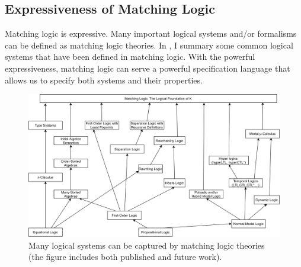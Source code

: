 \documentclass[11pt]{article}
\begin{document}




\subsection{Expressiveness of Matching Logic}
\label{sec:ml-expressiveness}

Matching logic is expressive. 
Many important logical systems and/or formalisms can be defined as matching 
logic theories. 
In , I summary some common logical systems that have been 
defined in matching logic. 
With the powerful expressiveness, matching logic can serve a powerful 
{specification language} that allows us to specify both systems and their 
properties. 

\begin{figure}[t]
\centering
\includegraphics[width=0.9\columnwidth]{figs/logics.png}
\caption{Many logical systems can be captured by matching logic theories (the figure includes both published and future work).}
\label{fig:logics}
\end{figure}
\end{document}
